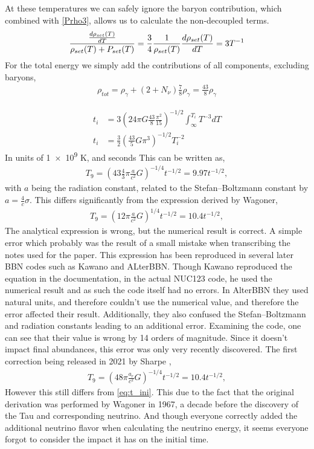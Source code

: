 At these temperatures we can safely ignore the baryon contribution, which combined with \eqref{Prho3}, allows us to calculate the non-decoupled terms.
\begin{align}
    \frac{\frac{d\rho_{set}(T)}{dT}}{\rho_{set}(T) + P_{set}(T)}=\frac{3}{4}\frac{1}{\rho_{set}(T)}\frac{d\rho_{set}(T)}{dT}=3T^{-1}
\end{align}
For the total energy we simply add the contributions of all components, excluding baryons,
\begin{align}
    \rho_{tot}=\rho_\gamma+(2+N_\nu)\frac{7}{8}\rho_\gamma=\frac{43}{8}\rho_\gamma
\end{align}

\begin{align}
    t_i&=3(24\pi G\frac{43}{8}\frac{\pi^2}{15})^{-1/2}\int_{\infty}^{T_i}T^{-3}dT\\
    t_i&=\frac{3}{2}( \frac{43}{5}G\pi^3)^{-1/2}T_i^{-2}
    \label{eq:t_ini}
\end{align}
In units of \num{1e9} K, and seconds This can be written as,
\begin{align}
    T_9=( 43 \frac{4}{3}\pi\frac{a}{c^2}G)^{-1/4}t^{-1/2}=9.97t^{-1/2},
\end{align}
with $a$ being the radiation constant, related to the Stefan–Boltzmann constant by $a=\frac{4}{c}\sigma$. This differs significantly from the expression derived by Wagoner\cite{Wagoner67},
\begin{align}
    T_9=(12\pi\frac{a}{c^2}G)^{1/4}t^{-1/2}=10.4t^{-1/2},
\end{align}
The analytical expression is wrong, but the numerical result is correct. A simple error which probably was the result of a small mistake when transcribing the notes used for the paper. This expression has been reproduced in several later BBN codes such as Kawano\cite{Kawano} and ALterBBN\cite{AlterBBN}. Though Kawano reproduced the equation in the documentation, in the actual NUC123 code, he used the numerical result and as such the code itself had no errors. In AlterBBN they used natural units, and therefore couldn't use the numerical value, and therefore the error affected their result. Additionally, they also confused the Stefan–Boltzmann and radiation constants leading to an additional error. Examining the code, one can see that their value is wrong by 14 orders of magnitude. %
Since it doesn't impact final abundances, this error was only very recently discovered. The first correction being released in 2021 by Sharpe \cite{sharpe2021big},
\begin{align}
    T_9=(48\pi\frac{a_r}{c^2}G)^{-1/4}t^{-1/2}=10.4t^{-1/2},
\end{align}
However this still differs from \eqref{eq:t_ini}. This due to the fact that the original derivation was performed by Wagoner in 1967, a decade before the discovery of the Tau and corresponding neutrino. And though everyone correctly added the additional neutrino flavor when calculating the neutrino energy, it seems everyone forgot to consider the impact it has on the initial time. 

